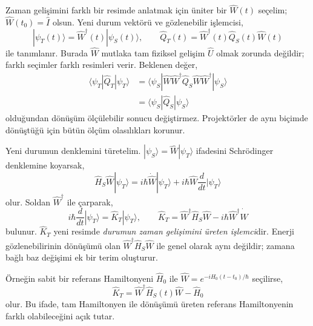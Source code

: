 \documentclass[00_kitap.tex]{subfiles}
\begin{document}
Zaman gelişimini farklı bir resimde anlatmak için üniter bir
$\hat W(t)$ seçelim; $\hat W(t_0)=\hat I$ olsun. Yeni durum vektörü
ve gözlenebilir işlemcisi,
\begin{equation}
 |\psi_T(t)\rangle=\hat W^\dagger(t)|\psi_S(t)\rangle,
 \qquad
 \hat Q_T(t)=\hat W^\dagger(t)\hat Q_S(t)\hat W(t)
 \label{eq:06_genel_donusum}
\end{equation}
ile tanımlanır. Burada $\hat W$ mutlaka tam fiziksel gelişim
$\hat U$ olmak zorunda değildir; farklı seçimler farklı resimleri
verir. Beklenen değer,
\begin{align}
 \langle\psi_T|\hat Q_T|\psi_T\rangle
 &=\langle\psi_S|\hat W\hat W^\dagger
          \hat Q_S\hat W\hat W^\dagger|\psi_S\rangle\\
 &=\boxed{\langle\psi_S|\hat Q_S|\psi_S\rangle}
 \label{eq:06_beklenen_degismez}
\end{align}
olduğundan dönüşüm ölçülebilir sonucu değiştirmez. Projektörler
de aynı biçimde dönüştüğü için bütün ölçüm olasılıkları korunur.

Yeni durumun denklemini türetelim. $|\psi_S\rangle=\hat W|\psi_T\rangle$
ifadesini Schrödinger denklemine koyarsak,
\begin{equation}
 \hat H_S\hat W|\psi_T\rangle
 =i\hbar\dot{\hat W}|\psi_T\rangle
  +i\hbar\hat W\frac{d}{dt}|\psi_T\rangle
\end{equation}
olur. Soldan $\hat W^\dagger$ ile çarparak,
\begin{equation}
 i\hbar\frac{d}{dt}|\psi_T\rangle=\hat K_T|\psi_T\rangle,
 \qquad
 \boxed{\hat K_T=\hat W^\dagger\hat H_S\hat W
                   -i\hbar\hat W^\dagger\dot{\hat W}}
 \label{eq:06_etkin_hamiltonyen}
\end{equation}
bulunur. $\hat K_T$ yeni resimde \emph{durumun zaman gelişimini
üreten işlemci}dir. Enerji gözlenebilirinin dönüşümü olan
$\hat W^\dagger\hat H_S\hat W$ ile genel olarak aynı değildir;
zamana bağlı baz değişimi ek bir terim oluşturur.

Örneğin sabit bir referans Hamiltonyeni $\hat H_0$ ile
$\hat W=e^{-i\hat H_0(t-t_0)/\hbar}$ seçilirse,
\begin{equation}
 \hat K_T=\hat W^\dagger\hat H_S(t)\hat W-\hat H_0
 \label{eq:06_referans_donusum}
\end{equation}
olur. Bu ifade, tam Hamiltonyen ile dönüşümü üreten referans
Hamiltonyenin farklı olabileceğini açık tutar.
\end{document}
